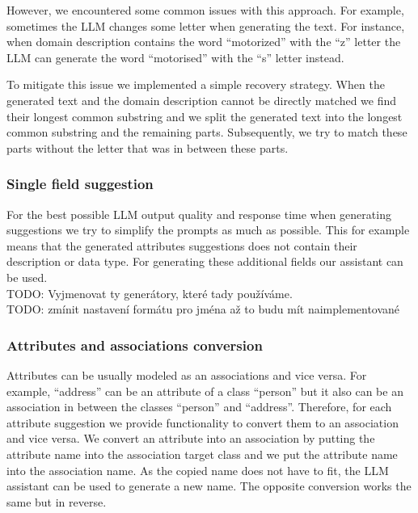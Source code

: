


However, we encountered some common issues with this approach. For example, sometimes the LLM changes some letter when generating the text. For instance, when domain description contains the word ``motorized'' with the ``z'' letter the LLM can generate the word ``motorised'' with the ``s'' letter instead.

To mitigate this issue we implemented a simple recovery strategy. When the generated text and the domain description cannot be directly matched we find their longest common substring and we split the generated text into the longest common substring and the remaining parts. Subsequently, we try to match these parts without the letter that was in between these parts.


\subsubsection{Single field suggestion}

For the best possible LLM output quality and response time when generating suggestions we try to simplify the prompts as much as possible. This for example means that the generated attributes suggestions does not contain their description or data type. For generating these additional fields our assistant can be used. \\

TODO: Vyjmenovat ty generátory, které tady používáme. \\

TODO: zmínit nastavení formátu pro jména až to budu mít naimplementované \\


\subsubsection{Attributes and associations conversion}

Attributes can be usually modeled as an associations and vice versa. For example, ``address'' can be an attribute of a class ``person'' but it also can be an association in between the classes ``person'' and ``address''. Therefore, for each attribute suggestion we provide functionality to convert them to an association and vice versa. We convert an attribute into an association by putting the attribute name into the association target class and we put the attribute name into the association name. As the copied name does not have to fit, the LLM assistant can be used to generate a new name. The opposite conversion works the same but in reverse.


